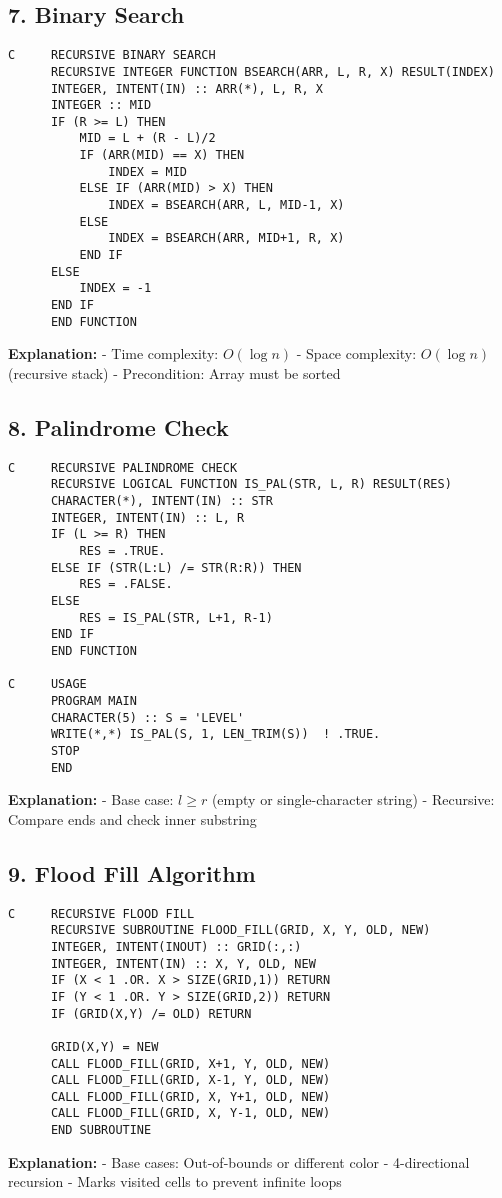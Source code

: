 \documentclass{book}
\begin{document}
\subsection*{7. Binary Search}
\begin{verbatim}
C     RECURSIVE BINARY SEARCH
      RECURSIVE INTEGER FUNCTION BSEARCH(ARR, L, R, X) RESULT(INDEX)
      INTEGER, INTENT(IN) :: ARR(*), L, R, X
      INTEGER :: MID
      IF (R >= L) THEN
          MID = L + (R - L)/2
          IF (ARR(MID) == X) THEN
              INDEX = MID
          ELSE IF (ARR(MID) > X) THEN
              INDEX = BSEARCH(ARR, L, MID-1, X)
          ELSE
              INDEX = BSEARCH(ARR, MID+1, R, X)
          END IF
      ELSE
          INDEX = -1
      END IF
      END FUNCTION
\end{verbatim}
\textbf{Explanation:}  
- Time complexity: \( O(\log n) \)  
- Space complexity: \( O(\log n) \) (recursive stack)  
- Precondition: Array must be sorted  

\subsection*{8. Palindrome Check}
\begin{verbatim}
C     RECURSIVE PALINDROME CHECK
      RECURSIVE LOGICAL FUNCTION IS_PAL(STR, L, R) RESULT(RES)
      CHARACTER(*), INTENT(IN) :: STR
      INTEGER, INTENT(IN) :: L, R
      IF (L >= R) THEN
          RES = .TRUE.
      ELSE IF (STR(L:L) /= STR(R:R)) THEN
          RES = .FALSE.
      ELSE
          RES = IS_PAL(STR, L+1, R-1)
      END IF
      END FUNCTION

C     USAGE
      PROGRAM MAIN
      CHARACTER(5) :: S = 'LEVEL'
      WRITE(*,*) IS_PAL(S, 1, LEN_TRIM(S))  ! .TRUE.
      STOP
      END
\end{verbatim}
\textbf{Explanation:}  
- Base case: \( l \geq r \) (empty or single-character string)  
- Recursive: Compare ends and check inner substring  

\subsection*{9. Flood Fill Algorithm}
\begin{verbatim}
C     RECURSIVE FLOOD FILL
      RECURSIVE SUBROUTINE FLOOD_FILL(GRID, X, Y, OLD, NEW)
      INTEGER, INTENT(INOUT) :: GRID(:,:)
      INTEGER, INTENT(IN) :: X, Y, OLD, NEW
      IF (X < 1 .OR. X > SIZE(GRID,1)) RETURN
      IF (Y < 1 .OR. Y > SIZE(GRID,2)) RETURN
      IF (GRID(X,Y) /= OLD) RETURN

      GRID(X,Y) = NEW
      CALL FLOOD_FILL(GRID, X+1, Y, OLD, NEW)
      CALL FLOOD_FILL(GRID, X-1, Y, OLD, NEW)
      CALL FLOOD_FILL(GRID, X, Y+1, OLD, NEW)
      CALL FLOOD_FILL(GRID, X, Y-1, OLD, NEW)
      END SUBROUTINE
\end{verbatim}
\textbf{Explanation:}  
- Base cases: Out-of-bounds or different color  
- 4-directional recursion  
- Marks visited cells to prevent infinite loops  
\end{document}

